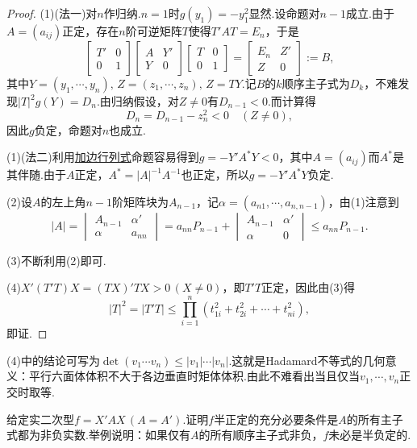 \begin{proof}
	(1)(法一)对$n$作归纳.$n=1$时$g(y_1)=-y_1^2$显然.设命题对$n-1$成立.由于$A=(a_{ij})$正定，存在$n$阶可逆矩阵$T$使得$T'AT=E_n$，于是
	\[
		\begin{bmatrix}
			T' & 0 \\
			0  & 1
		\end{bmatrix}\begin{bmatrix}
			A & Y' \\
			Y & 0
		\end{bmatrix}\begin{bmatrix}
			T & 0 \\
			0 & 1
		\end{bmatrix}=\begin{bmatrix}
			E_n & Z' \\
			Z   & 0
		\end{bmatrix}:=B,
	\]
	其中$Y=(y_1,\cdots,y_n),\,Z=(z_1,\cdots,z_n),\,Z=TY$.记$B$的$k$顺序主子式为$D_k$，不难发现$|T|^2g(Y)=D_n$.由归纳假设，对$Z\ne0$有$D_{n-1}<0$.而计算得
	\[
		D_n=D_{n-1}-z_n^2<0\quad(Z\ne 0),
	\]
	因此$g$负定，命题对$n$也成立.

	(1)(法二)利用\hyperlink{DeterminantWithAddedRowAndColumn}{加边行列式}命题容易得到$g=-Y'A^*Y<0$，其中$A=(a_{ij})$而$A^*$是其伴随.由于$A$正定，$A^*=|A|^{-1}A^{-1}$也正定，所以$g=-Y'A^*Y$负定.

	(2)设$A$的左上角$n-1$阶矩阵块为$A_{n-1}$，记$\alpha=(a_{n1},\cdots,a_{n,n-1})$，由(1)注意到
	\[
		|A|=\begin{vmatrix}
			A_{n-1} & \alpha' \\
			\alpha  & a_{nn}
		\end{vmatrix}=a_{nn}P_{n-1}+\begin{vmatrix}
			A_{n-1} & \alpha' \\
			\alpha  & 0
		\end{vmatrix}\le a_{nn}P_{n-1}.
	\]

	(3)不断利用(2)即可.

	(4)$X'(T'T)X=(TX)'TX>0\,(X\ne 0)$，即$T'T$正定，因此由(3)得
	\[
		|T|^2=|T'T|\le\prod_{i=1}^{n}(t_{1i}^2+t_{2i}^2+\cdots+t_{ni}^2),
	\]
	即证.
\end{proof}
\begin{note}
	(4)中的结论可写为$\det(v_1\cdots v_n)\le|v_1|\cdots|v_n|$.这就是Hadamard不等式的几何意义：平行六面体体积不大于各边垂直时矩体体积.由此不难看出当且仅当$v_1,\cdots,v_n$正交时取等.
\end{note}
\begin{prob}[11]
	给定实二次型$f=X'AX\,(A=A')$.证明$f$半正定的充分必要条件是$A$的所有主子式都为非负实数.举例说明：如果仅有$A$的所有顺序主子式非负，$f$未必是半负定的.
\end{prob}
